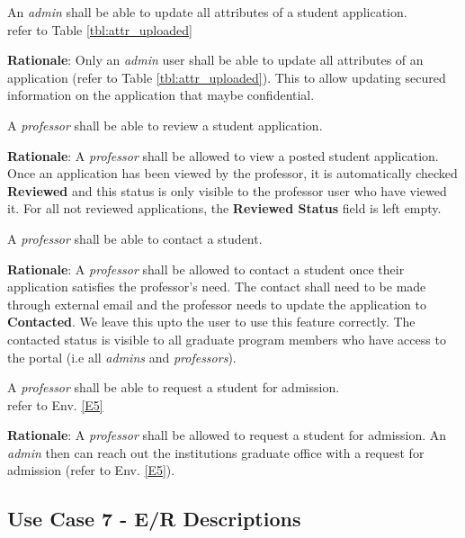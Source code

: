 \documentclass[fontsize=12pt,paper=letter,twoside]{scrartcl}
\begin{document}
\rdescription
{An \emph{admin} shall be able to update all attributes of a student application.\\}
{refer to Table \ref{tbl:attr_uploaded}}
\label{R20}

\smallskip
\noindent \textbf{Rationale}: Only an \emph{admin} user shall be able to update all attributes of an application (refer to Table \ref{tbl:attr_uploaded}). This to allow updating secured information on the application that maybe confidential.

\genreq
{A \emph{professor} shall be able to review a student application.\\}
{}
\label{R22}

\smallskip
\noindent \textbf{Rationale}: A \emph{professor} shall be allowed to view a posted student application. Once an application has been viewed by the professor, it is automatically checked \textbf{Reviewed} and this status is only visible to the professor user who have viewed it. For all not reviewed applications, the \textbf{Reviewed Status} field is left empty.

\genreq
{A \emph{professor} shall be able to contact a student.\\}
{}
\label{R23}

\smallskip
\noindent \textbf{Rationale}: A \emph{professor} shall be allowed to contact a student once their application satisfies the professor's need. The contact shall need to be made through external email and the professor needs to update the application to \textbf{Contacted}. We leave this upto the user to use this feature correctly. The contacted status is visible to all graduate program members who have access to the portal (i.e all \emph{admins} and \emph{professors}).

\rdescription
{A \emph{professor} shall be able to request a student for admission.\\}
{refer to Env. \ref{E5}}
\label{R24}

\smallskip
\noindent \textbf{Rationale}: A \emph{professor} shall be allowed to request a student for admission. An \emph{admin} then can reach out the institutions graduate office with a request for admission (refer to Env. \ref{E5}).

\subsection{Use Case 7 - E/R Descriptions}
\end{document}
